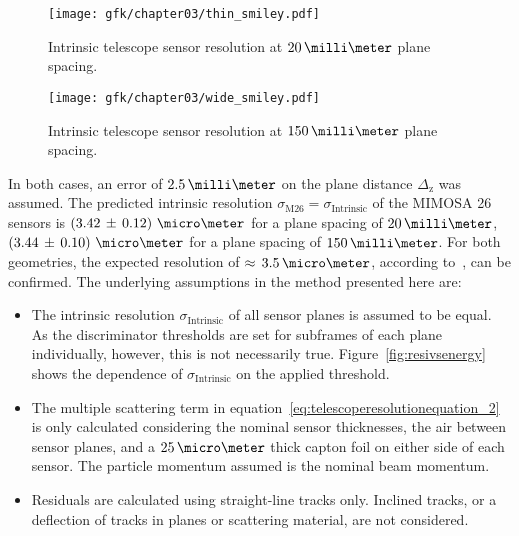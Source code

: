 \begin{figure}[hbtp]
\centering
\texttt{[image: gfk/chapter03/thin\_smiley.pdf]}
\caption[Intrinsic telescope sensor resolution at $20\,\milli\meter$ plane
spacing]{Intrinsic telescope sensor resolution at $20\,\milli\meter$ plane
spacing.}
\label{fig:smileythin}
\end{figure}



\begin{figure}[hbtp]
\centering
\texttt{[image: gfk/chapter03/wide\_smiley.pdf]}
\caption[Intrinsic telescope sensor resolution at $150\,\milli\meter$ plane
spacing]{Intrinsic telescope sensor resolution at $150\,\milli\meter$ plane
spacing.}
\label{fig:smileythick}
\end{figure}

In both cases, an error of $2.5\,\milli\meter$ on the plane distance
$\Delta_\textrm{z}$ was assumed. The predicted intrinsic resolution
$\sigma_{\textrm{M26}} = \sigma_{\textrm{Intrinsic}}$ of the MIMOSA 26 sensors
is \allowbreak$\left( 3.42\,\pm\, \allowbreak 0.12 \right)\,\micro\meter$ for a
plane spacing of
$20\,\milli\meter$, $\left( 3.44\,\pm\,0.10 \right)\,\micro\meter$ for a plane
spacing of $150\,\milli\meter$. For both geometries, the expected resolution of
$\approx\,3.5\,\micro\meter$, according to~\cite{ref:mimosa26}, can be
confirmed. The underlying assumptions in the method presented here are:\\

\begin{itemize}
\item The intrinsic resolution $\sigma_{\textrm{Intrinsic}}$ of all sensor
planes is assumed to be equal. As the discriminator thresholds are set for
subframes of each plane individually, however, this is not necessarily true.
Figure~\ref{fig:resivsenergy} shows the dependence of
$\sigma_{\textrm{Intrinsic}}$ on the applied threshold.\\

\item The multiple scattering term in
equation~\ref{eq:telescoperesolutionequation_2} is only calculated considering
the nominal sensor thicknesses, the air between sensor planes, and a
$25\,\micro\meter$ thick capton foil on either side of each sensor. The particle
momentum assumed is the nominal beam momentum.\\

\item Residuals are calculated using straight-line tracks only. Inclined tracks,
or a deflection of tracks in planes or scattering material, are not
considered.\\
\end{itemize}

